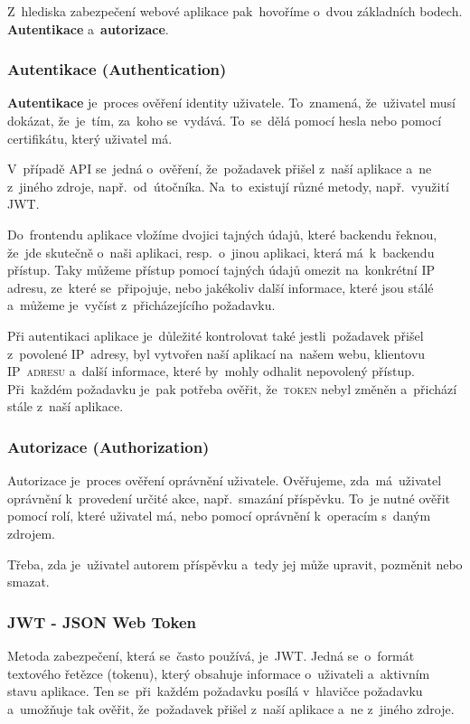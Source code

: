 \documentclass[14pt,a4paper]{article}
\begin{document}
        Z~hlediska zabezpečení webové aplikace pak~hovoříme o~dvou základních bodech. \textbf{Autentikace} a~\textbf{autorizace}.

            \subsubsection{Autentikace (Authentication)}
            \textbf{Autentikace} je~proces ověření identity uživatele. To~znamená, že~uživatel musí dokázat, že~je~tím, za~koho se~vydává. To~se~dělá pomocí hesla nebo pomocí certifikátu, který uživatel má.
            
            V~případě \textsc{API} se~jedná o~ověření, že~požadavek přišel z~naší aplikace a~ne z~jiného zdroje, např.~od~útočníka. Na~to~existují různé metody, např.~využití \textsc{JWT}.
            
            Do~frontendu aplikace vložíme dvojici tajných údajů, které backendu řeknou, že~jde skutečně o~naši aplikaci, resp.~o~jinou aplikaci, která má~k~backendu přístup. Taky můžeme přístup pomocí tajných údajů omezit na~konkrétní IP adresu, ze~které se~připojuje, nebo jakékoliv další informace, které jsou stálé a~můžeme je~vyčíst z~přicházejícího požadavku.

            Při autentikaci aplikace je~důležité kontrolovat také jestli~požadavek přišel z~povolené IP~adresy, byl vytvořen naší aplikací na~našem webu, klientovu \textsc{IP~adresu} a~další informace, které by~mohly odhalit nepovolený přístup. Při~každém požadavku je~pak potřeba ověřit, že~\textsc{token} nebyl změněn a~přichází stále z~naší aplikace. \parencite{graham2021ethical}
            
            \subsubsection{Autorizace (Authorization)}
            Autorizace je~proces ověření oprávnění uživatele. Ověřujeme, zda~má~uživatel oprávnění k~provedení určité akce, např.~smazání příspěvku.
            To~je nutné ověřit pomocí rolí, které uživatel má, nebo pomocí oprávnění k~operacím s~daným zdrojem.

            Třeba, zda je~uživatel autorem příspěvku a~tedy jej může upravit, pozměnit nebo smazat. \parencite{graham2021ethical}

            \subsubsection{JWT - JSON Web Token}
            Metoda zabezpečení, která se~často používá, je~JWT. Jedná se~o~formát textového řetězce (tokenu), který obsahuje informace o~uživateli a~aktivním stavu aplikace. Ten se~při~každém požadavku posílá v~hlavičce požadavku a~umožňuje tak ověřit, že~požadavek přišel z~naší aplikace a~ne z~jiného zdroje.
            
\end{document}

